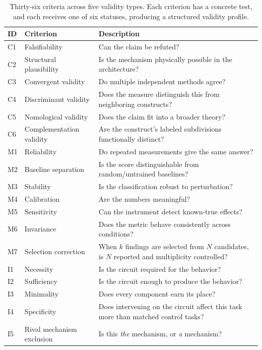 \documentclass{article}
\begin{document}
\begingroup
{}
\begin{table}[H]
\centering
\small
\caption{Thirty-six criteria across five validity types. Each criterion has a concrete test, and each receives one of six statuses, producing a structured validity profile.}
\label{tab:criteria}
\renewcommand{\arraystretch}{1.15}
\begin{tabular}{@{}llp{8.5cm}@{}}
\toprule
\textbf{ID} & \textbf{Criterion} & \textbf{Description} \\
\midrule
C1 & Falsifiability & Can the claim be refuted? \\
C2 & Structural plausibility & Is the mechanism physically possible in the architecture? \\
C3 & Convergent validity & Do multiple independent methods agree? \\
C4 & Discriminant validity & Does the measure distinguish this from neighboring constructs? \\
C5 & Nomological validity & Does the claim fit into a broader theory? \\
C6 & Complementation validity & Are the construct's labeled subdivisions functionally distinct? \\
\midrule
M1 & Reliability & Do repeated measurements give the same answer? \\
M2 & Baseline separation & Is the score distinguishable from random/untrained baselines? \\
M3 & Stability & Is the classification robust to perturbation? \\
M4 & Calibration & Are the numbers meaningful? \\
M5 & Sensitivity & Can the instrument detect known-true effects? \\
M6 & Invariance & Does the metric behave consistently across conditions? \\
M7 & Selection correction & When $k$ findings are selected from $N$ candidates, is $N$ reported and multiplicity controlled? \\
\midrule
I1 & Necessity & Is the circuit required for the behavior? \\
I2 & Sufficiency & Is the circuit enough to produce the behavior? \\
I3 & Minimality & Does every component earn its place? \\
I4 & Specificity & Does intervening on the circuit affect this task more than matched control tasks? \\
I5 & Rival mechanism exclusion & Is this \emph{the} mechanism, or \emph{a} mechanism? \\

\end{tabular}
\end{table}
\end{document}
